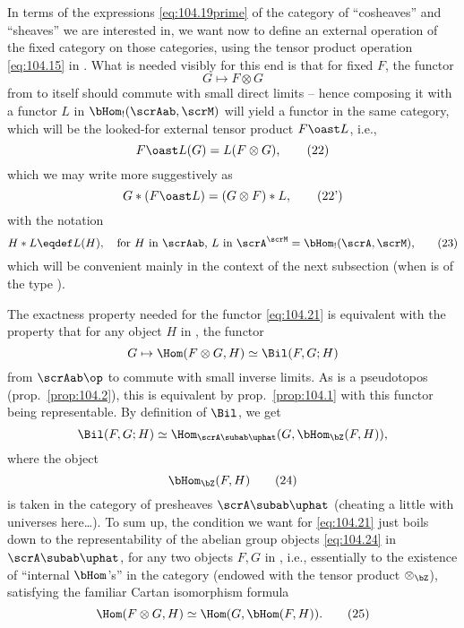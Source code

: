 In terms of the expressions \eqref{eq:104.19prime} of the category of
``cosheaves'' and ``sheaves'' we are interested in, we want now to
define an external operation of the fixed category \scrAab{} on those
categories, using the tensor product operation \eqref{eq:104.15} in
\scrAab. What is needed visibly for this end is that for fixed $F$,
the functor
\begin{equation}
  \label{eq:104.21}
  G\mapsto F\otimes G\tag{21}
\end{equation}
from \scrAab{} to itself should commute with small direct limits --
hence composing it with a functor $L$ in $\bHom_!(\scrAab,\scrM)$ will
yield a functor in the same category, which will be the looked-for
external tensor product $F\oast L$, i.e.,
\begin{equation}
  \label{eq:104.22}
  \mathop{F\oast L}(G) = L(F\otimes G),\tag{22}
\end{equation}
which we may write more suggestively as
\begin{equation}
  \label{eq:104.22prime}
  G * (F \oast L) = (G \otimes F) * L,\tag{22'}
\end{equation}
with the notation
\begin{equation}
  \label{eq:104.23}
  H * L \eqdef L(H), \quad\text{for $H$ in \scrAab, $L$ in
    $\scrA^\scrM=\bHom_!(\scrA,\scrM)$,}\tag{23}
\end{equation}
which will be convenient mainly in the context of the next
subsection (when \scrA{} is of the type \Ahat).

The exactness property needed for the functor \eqref{eq:104.21} is
equivalent with the property that for any object $H$ in \scrAab, the
functor
\[G\mapsto \Hom(F\otimes G,H) \simeq \Bil(F,G;H)\]
from $\scrAab\op$ to \Sets{} commute with small inverse limits. As
\scrAab{} is a pseudotopos (prop.\ \ref{prop:104.2}), this is
equivalent by prop.\ \ref{prop:104.1} with this functor being
representable. By definition of $\Bil$, we get
\[\Bil(F,G;H)\simeq\Hom_{\scrA\subab\uphat}(G, \bHom_{\bZ}(F,H)),\]
where the object
\begin{equation}
  \label{eq:104.24}
  \bHom_{\bZ}(F,H)\tag{24}
\end{equation}
is taken in the category of presheaves $\scrA\subab\uphat$ (cheating a
little with universes here\ldots). To sum up, the condition we want
for \eqref{eq:104.21} just boils down to the representability of the
abelian group objects \eqref{eq:104.24} in $\scrA\subab\uphat$, for
any two objects $F,G$ in \scrAab, i.e., essentially to the existence
of ``internal $\bHom$'s'' in the category \scrAab{} (endowed with the
tensor product $\otimes_{\bZ}$), satisfying the familiar Cartan
isomorphism formula
\begin{equation}
  \label{eq:104.25}
  \Hom(F\otimes G,H) \simeq\Hom(G,\bHom(F,H)).\tag{25}
\end{equation}

